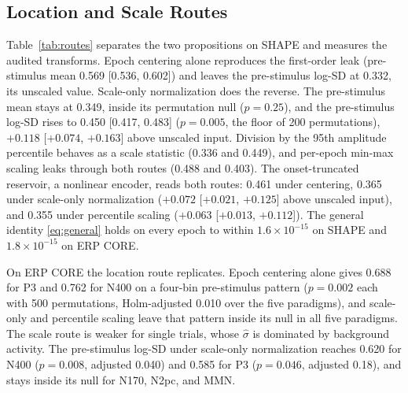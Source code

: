 \subsection{Location and Scale Routes}
Table~\ref{tab:routes} separates the two propositions on SHAPE and measures the audited transforms. Epoch centering alone reproduces the first-order leak (pre-stimulus mean 0.569 [0.536, 0.602]) and leaves the pre-stimulus log-SD at 0.332, its unscaled value. Scale-only normalization does the reverse. The pre-stimulus mean stays at 0.349, inside its permutation null ($p=0.25$), and the pre-stimulus log-SD rises to 0.450 [0.417, 0.483] ($p=0.005$, the floor of 200 permutations), $+0.118$ [$+0.074$, $+0.163$] above unscaled input. Division by the 95th amplitude percentile behaves as a scale statistic (0.336 and 0.449), and per-epoch min-max scaling leaks through both routes (0.488 and 0.403). The onset-truncated reservoir, a nonlinear encoder, reads both routes: 0.461 under centering, 0.365 under scale-only normalization ($+0.072$ [$+0.021$, $+0.125$] above unscaled input), and 0.355 under percentile scaling ($+0.063$ [$+0.013$, $+0.112$]). The general identity \eqref{eq:general} holds on every epoch to within $1.6\times10^{-15}$ on SHAPE and $1.8\times10^{-15}$ on ERP CORE.

On ERP CORE the location route replicates. Epoch centering alone gives 0.688 for P3 and 0.762 for N400 on a four-bin pre-stimulus pattern ($p=0.002$ each with 500 permutations, Holm-adjusted 0.010 over the five paradigms), and scale-only and percentile scaling leave that pattern inside its null in all five paradigms. The scale route is weaker for single trials, whose $\hat\sigma$ is dominated by background activity. The pre-stimulus log-SD under scale-only normalization reaches 0.620 for N400 ($p=0.008$, adjusted 0.040) and 0.585 for P3 ($p=0.046$, adjusted 0.18), and stays inside its null for N170, N2pc, and MMN.


